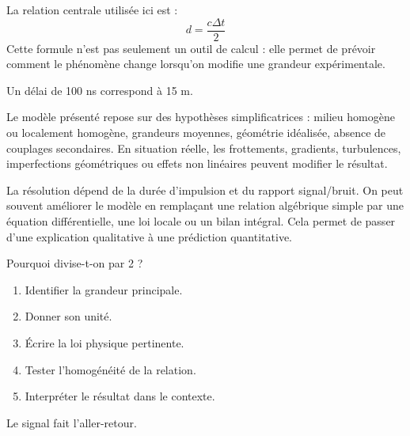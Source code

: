 \documentclass[11pt,a4paper]{article}
\begin{document}
\begin{theorembox}
La relation centrale utilisée ici est :
\[
d=\frac{c\Delta t}{2}
\]
Cette formule n'est pas seulement un outil de calcul : elle permet de prévoir comment le phénomène change lorsqu'on modifie une grandeur expérimentale.
\end{theorembox}

\begin{odgbox}
Un délai de 100 ns correspond à 15 m.
\end{odgbox}

\begin{attentionbox}
Le modèle présenté repose sur des hypothèses simplificatrices : milieu homogène ou localement homogène, grandeurs moyennes, géométrie idéalisée, absence de couplages secondaires. En situation réelle, les frottements, gradients, turbulences, imperfections géométriques ou effets non linéaires peuvent modifier le résultat.
\end{attentionbox}

\begin{approfondissementbox}
La résolution dépend de la durée d'impulsion et du rapport signal/bruit.
On peut souvent améliorer le modèle en remplaçant une relation algébrique simple par une équation différentielle, une loi locale ou un bilan intégral. Cela permet de passer d'une explication qualitative à une prédiction quantitative.
\end{approfondissementbox}

\begin{exercicebox}
Pourquoi divise-t-on par 2 ?
\begin{enumerate}
  \item Identifier la grandeur principale.
  \item Donner son unité.
  \item Écrire la loi physique pertinente.
  \item Tester l'homogénéité de la relation.
  \item Interpréter le résultat dans le contexte.
\end{enumerate}
\end{exercicebox}

\begin{corrigebox}[Indication]
Le signal fait l'aller-retour.
\end{corrigebox}


\end{document}
